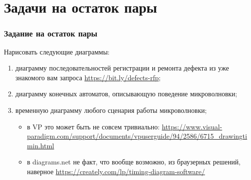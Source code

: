 \documentclass[xetex,mathserif,serif]{beamer}
\begin{document}
    \section{Задачи на остаток пары}

    \begin{frame}
        \frametitle{Задание на остаток пары}
        Нарисовать следующие диаграммы:
        \begin{enumerate}
            \item диаграмму последовательностей регистрации и ремонта дефекта из уже знакомого вам запроса \url{https://bit.ly/defects-rfp};
            \item диаграмму конечных автоматов, описывающую поведение микроволновки;
            \item временную диаграмму любого сценария работы микроволновки;
            \begin{itemize}
                \item в VP это может быть не совсем тривиально: \url{https://www.visual-paradigm.com/support/documents/vpuserguide/94/2586/6715_drawingtimin.html}
                \item в diagrams.net не факт, что вообще возможно, из браузерных решений, наверное \url{https://creately.com/lp/timing-diagram-software/}
            \end{itemize}
        \end{enumerate}
    \end{frame}
\end{document}
